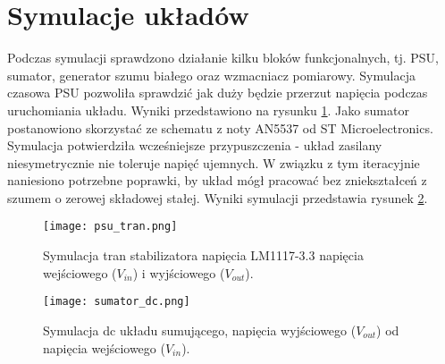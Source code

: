\section{Symulacje układów}
    Podczas symulacji sprawdzono działanie kilku bloków funkcjonalnych, tj. PSU, sumator, generator szumu białego oraz 
    wzmacniacz pomiarowy. Symulacja czasowa PSU pozwoliła sprawdzić jak duży będzie przerzut napięcia podczas uruchomiania 
    układu. Wyniki przedstawiono na rysunku \ref{fig:sym_LM1117}.  
    Jako sumator postanowiono skorzystać ze schematu z noty AN5537 od ST Microelectronics. Symulacja potwierdziła 
    wcześniejsze przypuszczenia - układ zasilany niesymetrycznie nie toleruje napięć ujemnych. W związku z tym 
    iteracyjnie naniesiono potrzebne poprawki, by układ mógł pracować bez zniekształceń z szumem o zerowej składowej stałej. 
    Wyniki symulacji przedstawia rysunek \ref{fig:sym_sum}. 
    \begin{figure}[!ht]
        \centering
        \texttt{[image: psu\_tran.png]}
        \caption{Symulacja tran stabilizatora napięcia LM1117-3.3 napięcia wejściowego ($V_{in}$) i wyjściowego ($V_{out}$).}
        \label{fig:sym_LM1117}
    \end{figure}
    \begin{figure}[!ht]
        \centering
        \texttt{[image: sumator\_dc.png]}
        \caption{Symulacja dc układu sumującego, napięcia wyjściowego ($V_{out}$) od napięcia wejściowego ($V_{in}$).}
        \label{fig:sym_sum}
    \end{figure}
    
